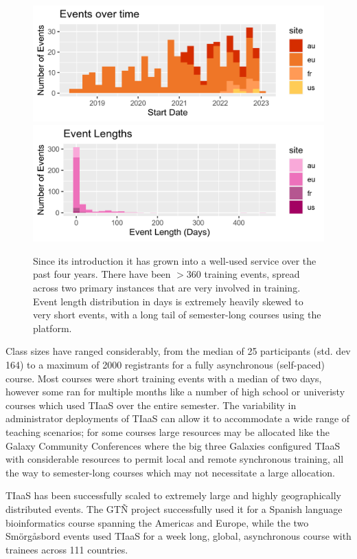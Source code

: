 \documentclass[a4paper,num-refs]{oup-contemporary}
\begin{document}
\begin{figure}[bt!]
\centering
	\includegraphics[width=\linewidth]{images/event-starts.png}
	\includegraphics[width=\linewidth]{images/event-lengths.png}
	\caption{Since its introduction it has grown into a well-used service over the past four years. There have been $>360$ training events, spread across two primary instances that are very involved in training. Event length distribution in days is extremely heavily skewed to very short events, with a long tail of semester-long courses using the platform.}\label{figure:graphs}
\end{figure}

Class sizes have ranged considerably, from the median of 25 participants (std. dev 164) to a maximum of 2000 registrants for a fully asynchronous (self-paced) course. Most courses were short training events with a median of two days, however some ran for multiple months like a number of high school or univeristy courses which used TIaaS over the entire semester. The variability in administrator deployments of TIaaS can allow it to accommodate a wide range of teaching scenarios; for some courses large resources may be allocated like the Galaxy Community Conferences where the big three Galaxies configured TIaaS with considerable resources to permit local and remote synchronous training, all the way to semester-long courses which may not necessitate a large allocation.

TIaaS has been successfully scaled to extremely large and highly geographically distributed events. The GT\~{N} project successfully used it for a Spanish language bioinformatics course spanning the Americas and Europe, while the two Sm\"{o}rg\r{a}sbord events used TIaaS for a week long, global, asynchronous course with trainees across 111 countries.
\end{document}
